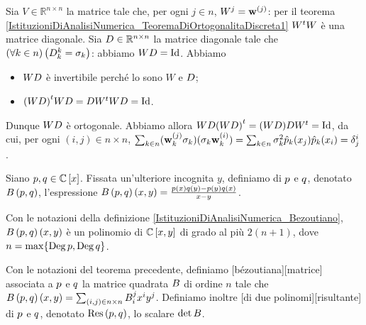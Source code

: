 \Proof Sia $V \in \mathbb{R}^{n \times n}$ la matrice tale che, per ogni $j \in n$, $W^j = \mathbf{w}^{(j)}$: per il teorema \ref{IstituzioniDiAnalisiNumerica_TeoremaDiOrtogonalitaDiscreta1} ${W}^tW$ \`e una matrice diagonale. Sia $D \in \mathbb{R}^{n \times n}$ la matrice diagonale tale che $\left ( \forall k \in n \right ) \left ( D_k^k = \sigma_k \right )$: abbiamo $W\DiagonalMatrix = \Identity$. Abbiamo
\begin{itemize}
	\item $WD$ \`e invertibile perch\'e lo sono $W$ e $D$;
	\item $\Transposed{(W\DiagonalMatrix)}W\DiagonalMatrix = \DiagonalMatrix \Transposed{W}W \DiagonalMatrix = \Identity$.
\end{itemize}
\par Dunque $WD$ \`e ortogonale. Abbiamo allora $W\DiagonalMatrix\Transposed{(W\DiagonalMatrix)} = (W\DiagonalMatrix) \DiagonalMatrix\Transposed{W} = \Identity$, da cui, per ogni $(i,j) \in n \times n$, $\sum_{k \in n} (\mathbf{w}_k^{(j)}\sigma_k)(\sigma_k\mathbf{w}_k^{(i)}) = \sum_{k \in n} \sigma_k^2 \hat{p}_k(x_j) \hat{p}_k(x_i) = \delta^{i}_{j}$. \EndProof
\begin{Definition}
	\label{IstituzioniDiAnalisiNumerica_Bezoutiano}
	Siano $p, q \in \mathbb{C} \left [ x \right ]$. Fissata un'ulteriore incognita $y$, definiamo  di $p$ e $q$, denotato $B \left ( p,q \right)$, l'espressione  $B \left ( p,q \right)(x,y) = \frac{p(x)q(y) - p(y)q(x)}{x - y}$.
\end{Definition}
\begin{Theorem}
	Con le notazioni della definizione \ref{IstituzioniDiAnalisiNumerica_Bezoutiano}, $B \left ( p,q \right)(x,y)$ \`e un polinomio di $\mathbb{C} \left [ x,y \right ]$ di grado al pi\`u $2(n + 1)$, dove $n = \max \lbrace \operatorname{\operatorname{Deg}}{p}, \operatorname{\operatorname{Deg}}{q} \rbrace$. 
\end{Theorem}
\begin{Definition}
	\label{IstituzioniDiAnalisiNumerica_MatriceBezoutiana}
	Con le notazioni del teorema precedente, definiamo [b\'ezoutiana][matrice] associata a $p$ e $q$ la matrice quadrata $B$ di ordine $n$ tale che $B \left ( p,q \right)(x,y) = \sum_{(i,j) \in n \times n} B_i^j x^i y^j$. Definiamo inoltre [di due polinomi][risultante] di $p$ e $q$, denotato $\text{Res} \left ( p , q \right )$, lo scalare $\operatorname{det}{B}$.
\end{Definition}
